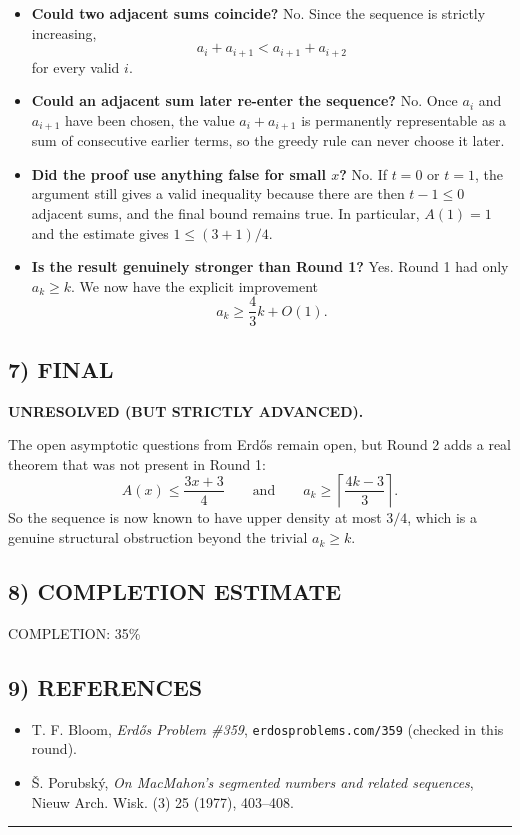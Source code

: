 \begin{itemize}
\item \textbf{Could two adjacent sums coincide?}  
No.  Since the sequence is strictly increasing,
\[
a_i+a_{i+1}<a_{i+1}+a_{i+2}
\]
for every valid $i$.

\item \textbf{Could an adjacent sum later re-enter the sequence?}  
No.  Once $a_i$ and $a_{i+1}$ have been chosen, the value $a_i+a_{i+1}$ is permanently representable as a sum of consecutive earlier terms, so the greedy rule can never choose it later.

\item \textbf{Did the proof use anything false for small $x$?}  
No.  If $t=0$ or $t=1$, the argument still gives a valid inequality because there are then $t-1\le 0$ adjacent sums, and the final bound remains true.  In particular, $A(1)=1$ and the estimate gives $1\le (3+1)/4$.

\item \textbf{Is the result genuinely stronger than Round 1?}  
Yes.  Round 1 had only $a_k\ge k$.  We now have the explicit improvement
\[
a_k\ge \frac43k+O(1).
\]
\end{itemize}

\subsection*{7) FINAL}
\textbf{UNRESOLVED (BUT STRICTLY ADVANCED).}

The open asymptotic questions from Erd\H{o}s remain open, but Round 2 adds a real theorem that was not present in Round 1:
\[
A(x)\le \frac{3x+3}{4}
\qquad\text{and}\qquad
a_k\ge \left\lceil \frac{4k-3}{3}\right\rceil.
\]
So the sequence is now known to have upper density at most $3/4$, which is a genuine structural obstruction beyond the trivial $a_k\ge k$.

\subsection*{8) COMPLETION ESTIMATE}
COMPLETION: 35\%

\subsection*{9) REFERENCES}
\begin{itemize}
\item T. F. Bloom, \emph{Erd\H{o}s Problem \#359}, \texttt{erdosproblems.com/359} (checked in this round).
\item \v{S}. Porubsk\'y, \emph{On MacMahon's segmented numbers and related sequences}, Nieuw Arch. Wisk. (3) 25 (1977), 403--408.
\end{itemize}

\bigskip
\hrule
\bigskip

